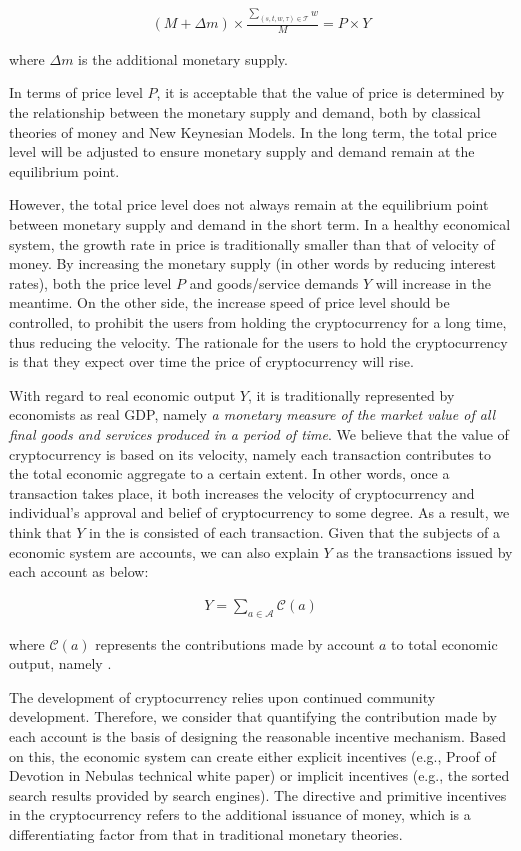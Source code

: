 \begin{align}
(M + \Delta{m}) \times \frac{\sum_{(s, t, w, \tau)\in \mathcal{T}}{w}}{M} = P \times Y
\label{eq:cur_ext}
\end{align}

\noindent where $\Delta{m}$ is the additional monetary supply.

In terms of price level $P$, it is acceptable that the value of price is determined by the relationship between the monetary supply and demand, both by classical theories of money and New Keynesian Models. In the long term, the total price level will be adjusted to ensure monetary supply and demand remain at the equilibrium point.

However, the total price level does not always remain at the equilibrium point between monetary supply and demand in the short term. In a healthy economical system, the growth rate in price is traditionally smaller than that of velocity of money. By increasing the monetary supply (in other words by reducing interest rates), both the price level $P$ and goods/service demands $Y$ will increase in the meantime. On the other side, the increase speed of price level should be controlled, to prohibit the users from holding the cryptocurrency for a long time, thus reducing the velocity. The rationale for the users to hold the cryptocurrency is that they expect over time the price of cryptocurrency will rise.


With regard to real economic output $Y$, it is traditionally represented by
economists as real GDP, namely \emph{a monetary measure of the market value of
all final goods and services produced in a period of time}. We believe that the
value of cryptocurrency is based on its velocity, namely each transaction
contributes to the total economic aggregate to a certain extent. In other
words, once a transaction takes place, it both increases the velocity of
cryptocurrency and individual's approval and belief of cryptocurrency to some
degree. As a result, we think that $Y$ in the  is consisted of each transaction. Given that the subjects of a economic system are accounts, we can also explain $Y$ as the transactions issued by each account as below:

\begin{align}
Y=\sum_{a\in \mathcal{A}} \mathcal{C}(a)
\end{align}

\noindent where $\mathcal{C}(a)$ represents the contributions made by account $a$ to total economic output, namely \nrcore.

The development of cryptocurrency relies upon continued community development. Therefore, we consider that quantifying the contribution made by each account is the basis of designing the reasonable incentive mechanism. Based on this, the economic system can create either explicit incentives (e.g., Proof of Devotion in Nebulas technical white paper) or implicit incentives (e.g., the sorted search results provided by search engines).
The directive and primitive incentives in the cryptocurrency refers to the additional issuance of money, which is a differentiating factor from that in traditional monetary theories.

